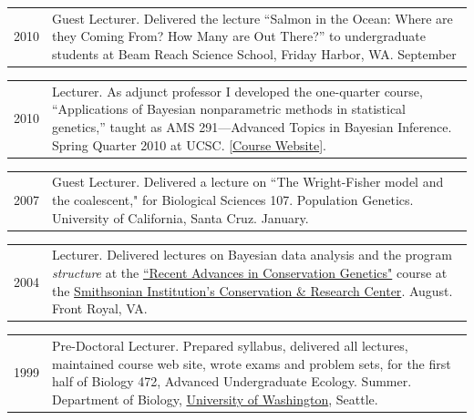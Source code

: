 \documentclass[11pt]{article}
\newlength{\myindent}
\newlength{\scndcol}
\begin{document}
\begin{tabular}{ @{}p{2.5\myindent} p{\scndcol}@{}  }
\hspace*{\myindent}2010 &  Guest Lecturer.  Delivered the lecture ``Salmon in the Ocean: Where are they Coming From? 
How Many are Out There?'' to undergraduate students at Beam Reach Science School, Friday Harbor, WA. September
\end{tabular}


\begin{tabular}{ @{}p{2.5\myindent} p{\scndcol}@{}  }
\hspace*{\myindent}2010 &  Lecturer.  As adjunct professor I developed the one-quarter course, ``Applications of Bayesian nonparametric methods in statistical genetics,'' taught as AMS 291---Advanced Topics in Bayesian Inference.  Spring Quarter 2010 at UCSC.  [\href{http://www.soe.ucsc.edu/classes/ams291/Spring10/}{Course Website}].
\end{tabular}



\begin{tabular}{ @{}p{2.5\myindent} p{\scndcol}@{}  }
\hspace*{\myindent}2007 &  Guest Lecturer.  Delivered a lecture on ``The Wright-Fisher model and  the coalescent," for Biological Sciences 107. Population Genetics.   University of California, Santa Cruz. January.
\end{tabular}




\begin{tabular}{ @{}p{2.5\myindent} p{\scndcol}@{}  }
\hspace*{\myindent}2004 &  Lecturer.  Delivered lectures on Bayesian data analysis and the program {\sl structure} at the \href{http://home.ncifcrf.gov/ccr/lgd/geneticscourse/congen_2004/index_2004.asp}{``Recent Advances in Conservation Genetics"} course at the \href{http://nationalzoo.si.edu/ConservationAndScience/CRC/}{Smithsonian Institution's Conservation \& Research Center}.  August.   Front Royal, VA.
\end{tabular}



\begin{tabular}{ @{}p{2.5\myindent} p{\scndcol}@{}  }
\hspace*{\myindent}1999 &  Pre-Doctoral Lecturer. Prepared syllabus, delivered all lectures,
maintained course web site, wrote exams and problem sets,
for the first half of Biology 472, Advanced Undergraduate Ecology.  Summer.  
Department of Biology, \href{http://www.washington.edu/}{University of Washington}, Seattle.
\end{tabular}
\end{document}
